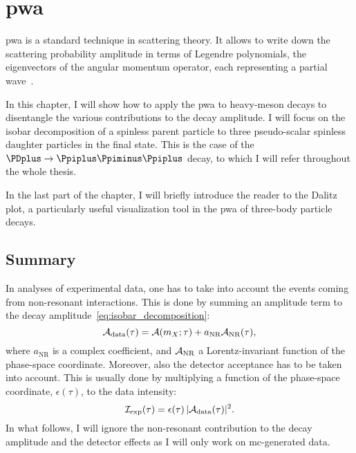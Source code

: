 \chapter{\texorpdfstring{\Acl{pwa}}{Partial-wave analysis}}
\label{chap:theory}

    \Ac{pwa} is a standard technique in scattering theory.
    It allows to write down the scattering probability amplitude in terms of Legendre polynomials, the eigenvectors of the angular momentum operator, each representing a partial wave~\cite[\S~11.2]{griffiths_intro_qm}.


    In this chapter, I will show how to apply the \ac{pwa} to heavy-meson decays to disentangle the various contributions to the decay amplitude.
    I will focus on the isobar decomposition of a spinless parent particle to three pseudo-scalar spinless daughter particles in the final state.
    This is the case of the $\PDplus\to\Ppiplus\Ppiminus\Ppiplus$ decay, to which I will refer throughout the whole thesis.


    In the last part of the chapter, I will briefly introduce the reader to the Dalitz plot, a particularly useful visualization tool in the \ac{pwa} of three-body particle decays.

    
    

    \section{Summary}

    In analyses of experimental data, one has to take into account the events coming from non-resonant interactions.
    This is done by summing an amplitude term to the decay amplitude~\eqref{eq:isobar_decomposition}:
    \begin{equation}
        \mathcal{A}_{\text{data}}(\tau) = \mathcal{A}(m_X;\tau) + a_{\text{NR}} \mathcal{A}_{\text{NR}}(\tau),
    \end{equation}
    where $a_{\text{NR}}$ is a complex coefficient, and $\mathcal{A}_{\text{NR}}$ a Lorentz-invariant function of the phase-space coordinate.
    Moreover, also the detector acceptance has to be taken into account.
    This is usually done by multiplying a function of the phase-space coordinate, $\epsilon(\tau)$, to the data intensity:
    \begin{equation}
        \mathcal{I}_{\text{exp}}(\tau) = \epsilon(\tau)\,\lvert\mathcal{A}_{\text{data}}(\tau)\rvert^2.
    \end{equation}
    In what follows, I will ignore the non-resonant contribution to the decay amplitude and the detector effects as I will only work on \ac{mc}-generated data.


